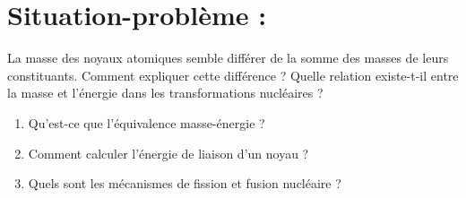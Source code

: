 \documentclass[13pt]{article}
\begin{document}
\section*{Situation-problème :}

La masse des noyaux atomiques semble différer de la somme des masses de leurs constituants. Comment expliquer cette différence ? Quelle relation existe-t-il entre la masse et l'énergie dans les transformations nucléaires ?

\begin{enumerate}
  \item Qu'est-ce que l'équivalence masse-énergie ?
  \item Comment calculer l'énergie de liaison d'un noyau ?
  \item Quels sont les mécanismes de fission et fusion nucléaire ?
\end{enumerate}
\end{document}
